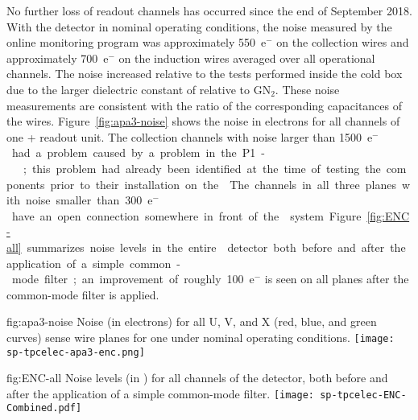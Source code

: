 No %
further loss of readout channels has occurred since 
the end of September 2018.
With the detector in nominal operating conditions, the noise
measured by the online monitoring program was approximately 550~e$^-$ 
on the collection wires and approximately 700~e$^-$ on the induction
wires averaged over all operational channels. The noise increased %
relative to the tests performed inside the cold box due to the 
larger dielectric constant of \lntwo relative to GN$_2$. 
These noise measurements  %
are consistent with the 
ratio of the corresponding capacitances of the  wires. 
Figure~\ref{fig:apa3-noise} 
shows the noise in electrons for all channels of one %
+ readout unit. %
The collection channels with noise larger than \SI{1500}{e$^-$} had a problem %
caused by a problem in the P1- 
;  %
this problem had already
been identified at the time of testing the components prior to their
installation on the . The channels in all three planes 
with noise smaller than \SI{300}{e$^-$} have an open connection somewhere in 
front of the  system. Figure~\ref{fig:ENC-all} summarizes
noise levels in the entire  detector both before and
after the application of a simple common-mode filter; an improvement
of roughly 100~e$^-$ is seen on all planes after the common-mode
filter is applied.

\begin{dunefigure}
{fig:apa3-noise}
{Noise (in electrons) for all U, V, and X (red, blue, and green curves) sense 
wire planes for one   %
under nominal operating 
conditions.}
\texttt{[image: sp-tpcelec-apa3-enc.png]}
\end{dunefigure}

\begin{dunefigure}
{fig:ENC-all}
{Noise levels (in ) for all channels of the  detector, both
before and after the application of a simple common-mode filter.}
\texttt{[image: sp-tpcelec-ENC-Combined.pdf]}
\end{dunefigure}

